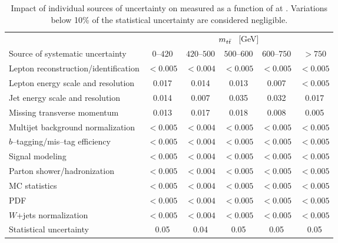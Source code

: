 
\begin{table}[!htbp]\centering
\begin{tabular}{l c c c c c}
\toprule
 &\multicolumn{5}{c}{$m_{t\bar{t}}{}$ ~[GeV]} \\
Source of systematic uncertainty           &         $0$--$420$ & $420$--$500$      & $500$--$600$         & $600$--$750$      &   $>750$ \\
\midrule
Lepton reconstruction/identification              & $<0.005$ & $<0.004$ & $<0.005$ & $<0.005$ & $<0.005$  \\
Lepton energy scale and resolution                & 0.017 & 0.014 & 0.013 & 0.007 & $<0.005$ \\
Jet energy scale and resolution                   & 0.014 & 0.007 & 0.035 & 0.032 & 0.017 \\
Missing transverse momentum & 0.013 & 0.017 & 0.018 & 0.008 & 0.005 \\
Multijet background normalization    & $<0.005$ & $<0.004$ & $<0.005$ & $<0.005$ & $<0.005$ \\
$b$--tagging/mis--tag efficiency                & $<0.005$ & $<0.004$ & $<0.005$ & $<0.005$ & $<0.005$ \\
Signal modeling                        & $<0.005$ & $<0.004$ & $<0.005$ & $<0.005$ & $<0.005$ \\
Parton shower/hadronization             & $<0.005$ & $<0.004$ & $<0.005$ & $<0.005$ & $<0.005$ \\
MC statistics                 & $<0.005$ & $<0.004$ & $<0.005$ & $<0.005$ & $<0.005$ \\
PDF                                     & $<0.005$ & $<0.004$ & $<0.005$ & $<0.005$ & $<0.005$ \\
$W$+jets normalization        & $<0.005$ & $<0.004$ & $<0.005$ & $<0.005$ & $<0.005$ \\
\midrule
Statistical uncertainty                    & 0.05 &        0.04 &        0.05  &       0.05   &   0.05    \\
\bottomrule
\end{tabular}
\caption{Impact of individual sources of uncertainty on
  \ac{} measured as a function of \mtt{} at \seventev{}. Variations below 10\%
  of the statistical uncertainty are considered negligible.}
\label{table:Systematics_mtt}
\end{table}

